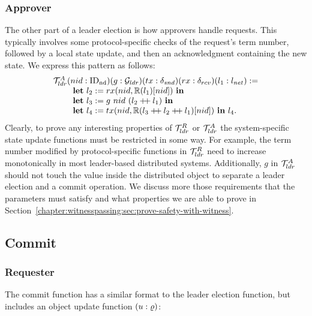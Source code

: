 \subsubsection{Approver}
The other part of a leader election is how approvers handle requests.
This typically involves some protocol-specific checks of the request's
term number, followed by a local state update, and then an acknowledgment
containing the new state. We express this pattern as follows:
$$
\begin{array}{l}
	\mathcal{T}^{A}_{ldr} (nid: \mathrm{ID_{nd}}) (g:  \mathcal{G}_{ldr})
	(tx: \delta_{snd})(rx: \delta_{rcv})(l_1  :{l_{net}} ) := \\
\ \ \ \ \ \ \ \mbox{\textbf{let}} \ l_2 := rx(nid, \mathbb{R}(l_1)[nid]) \
  \mbox{\textbf{in}} \\
\ \ \ \ \ \ \ \mbox{\textbf{let}}\ l_3  := g\ nid \ (l_2 \mathbin{+\mkern-4mu+} l_1) \ \mbox{\textbf{in}} \\
\ \ \ \ \ \ \ \mbox{\textbf{let}} \ l_4 :=  tx(nid, \mathbb{R}(l_3 \mathbin{+\mkern-4mu+} l_2 \mathbin{+\mkern-4mu+} l_1)[nid]) \ \mbox{\textbf{in}} \ l_4.
   \\
\end{array}
$$
Clearly, to prove any interesting properties of $\mathcal{T}^{R}_{ldr}$ or $\mathcal{T}^{A}_{ldr}$
the system-specific state update functions must be restricted in some way.
For example, the term number modified by protocol-specific functions in $\mathcal{T}^{R}_{ldr}$
need to increase monotonically in most leader-based distributed systems.
Additionally, $g$ in $\mathcal{T}^{A}_{ldr}$ should not touch the value inside
the distributed object to separate a leader election and a commit operation.
We discuss more those requirements that the parameters must satisfy and what properties we
are able to prove in Section~\ref{chapter:witnesspassing:sec:prove-safety-with-witness}.

\subsection{Commit}
\label{chapter:witnesspassing:subsec:commit}

\subsubsection{Requester}
The commit function has a similar format to the leader election function, but
includes an object update function $(u : \varrho)$:


